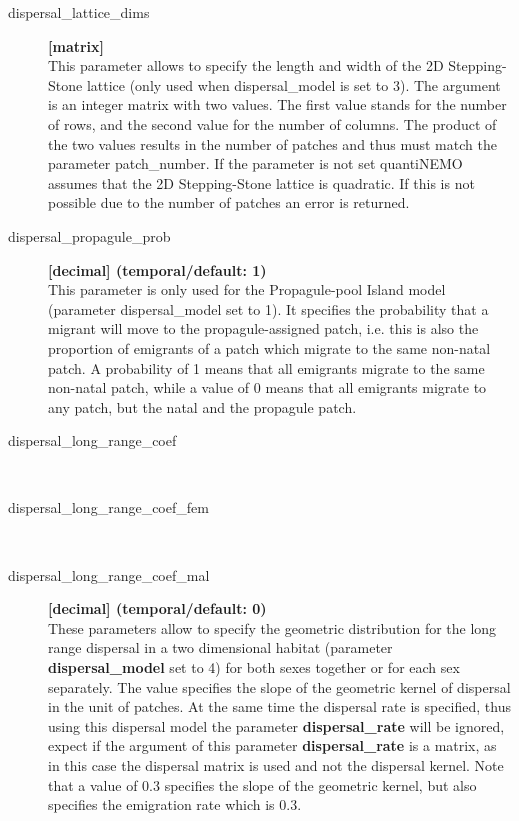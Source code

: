 \documentclass[letterpaper,12pt,oneside]{book}
\begin{document}
\begin{description}
\item[dispersal\_lattice\_dims] \textbf{[matrix]}\\
This parameter allows to specify the length and width of the 2D Stepping-Stone lattice (only used when \textsf{dispersal\_model} is set to 3). The argument is an integer matrix with two values. The first value stands for the number of rows, and the second value for the number of columns. The product of the two values results in the number of patches and thus must match the parameter \textsf{patch\_number}. If the parameter is not set quantiNEMO assumes that the 2D Stepping-Stone lattice is quadratic. If this is not possible due to the number of patches an error is returned. 


\item[dispersal\_propagule\_prob] \textbf{[decimal] (temporal/default: 1)}\\
This parameter is only used for the Propagule-pool Island model (parameter \textsf{dispersal\_model} set to 1). It specifies the probability that a migrant will move to the propagule-assigned patch, i.e. this is also the proportion of emigrants of a patch which migrate to the same non-natal patch. A probability of 1 means that all emigrants migrate to the same non-natal patch, while a value of 0 means that all emigrants migrate to any patch, but the natal and the propagule patch. 

\item[dispersal\_long\_range\_coef]\hspace*{\fill}\\
\vspace{-9mm}
\item[dispersal\_long\_range\_coef\_fem]\hspace*{\fill}\\
\vspace{-9mm}
\item[dispersal\_long\_range\_coef\_mal]\textbf{[decimal] (temporal/default: 0)}\\
These parameters allow to specify the geometric distribution for the long range dispersal in a two dimensional habitat (parameter \textbf {dispersal\_model} set to 4) for both sexes together or for each sex separately. The value specifies the slope of the geometric kernel of dispersal in the unit of patches. At the same time the dispersal rate is specified, thus using this dispersal model the parameter \textbf{dispersal\_rate} will be ignored, expect if the argument of this parameter \textbf{dispersal\_rate} is a matrix, as in this case the dispersal matrix is used and not the dispersal kernel. Note that a value of 0.3 specifies the slope of the geometric kernel, but also specifies the emigration rate which is 0.3.   
\end{description}
\end{document}
